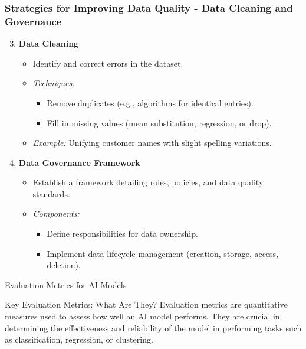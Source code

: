 \documentclass[aspectratio=169]{beamer}
\begin{document}
\begin{frame}[fragile]
    \frametitle{Strategies for Improving Data Quality - Data Cleaning and Governance}
    \begin{enumerate}
        \setcounter{enumi}{2}
        \item \textbf{Data Cleaning}
        \begin{itemize}
            \item Identify and correct errors in the dataset.
            \item \textit{Techniques:}
            \begin{itemize}
                \item Remove duplicates (e.g., algorithms for identical entries).
                \item Fill in missing values (mean substitution, regression, or drop).
            \end{itemize}
            \item \textit{Example:} Unifying customer names with slight spelling variations.
        \end{itemize}
        
        \item \textbf{Data Governance Framework}
        \begin{itemize}
            \item Establish a framework detailing roles, policies, and data quality standards.
            \item \textit{Components:}
            \begin{itemize}
                \item Define responsibilities for data ownership.
                \item Implement data lifecycle management (creation, storage, access, deletion).
            \end{itemize}
        \end{itemize}
    \end{enumerate}
\end{frame}

\begin{frame}[fragile]{Evaluation Metrics for AI Models}
    \begin{block}{Key Evaluation Metrics: What Are They?}
        Evaluation metrics are quantitative measures used to assess how well an AI model performs. They are crucial in determining the effectiveness and reliability of the model in performing tasks such as classification, regression, or clustering.
    \end{block}
\end{frame}
\end{document}
